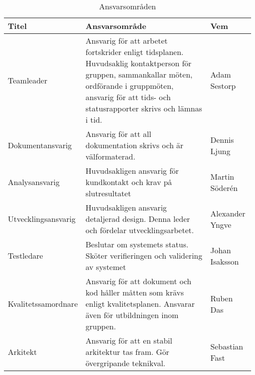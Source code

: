 \begin{table}[h]
  \centering
    \begin{tabularx}{\textwidth}{| l | X | l |}
      \hline
      \textbf{Titel} & \textbf{Ansvarsområde} & \textbf{Vem} \\
      \hline
      {Teamleader} & {Ansvarig för att arbetet fortskrider enligt tidsplanen. Huvudsaklig kontaktperson för gruppen, sammankallar möten, ordförande i gruppmöten, ansvarig för att tids- och statusrapporter skrivs och lämnas i tid.} & {Adam Sestorp} \\\hline
      
      {Dokumentansvarig} & {Ansvarig för att all dokumentation skrivs och är välformaterad.} & {Dennis Ljung} \\\hline
      
      {Analysansvarig} & {Huvudsakligen ansvarig för kundkontakt och krav på slutresultatet} & {Martin Söderén} \\\hline
      
      {Utvecklingsansvarig} & {Huvudsakligen ansvarig detaljerad design. Denna leder och fördelar utvecklingsarbetet. } & {Alexander Yngve} \\\hline
      
      {Testledare} & {Beslutar om systemets status. Sköter verifieringen och validering av systemet} & {Johan Isaksson} \\\hline
      
      {Kvalitetssamordnare} & {Ansvarig för att dokument och kod håller måtten som krävs enligt kvalitetsplanen. Ansvarar även för utbildningen inom gruppen.} & {Ruben Das} \\\hline
      
        {Arkitekt} & {Ansvarig för att en stabil arkitektur tas fram. Gör övergripande teknikval. } & {Sebastian Fast} \\\hline
    \end{tabularx}
  \caption{Ansvarsområden} \label{projektplan:ansvarsomraden}
\end{table}

\newpage